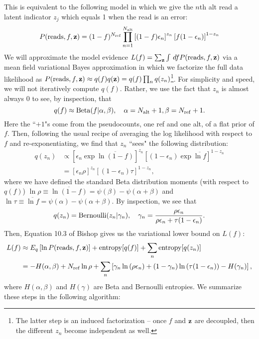\documentclass[nofootinbib,amssymb,amsmath]{revtex4}
\newcommand{\vz}{{\bf z}}
\begin{document}
This is equivalent to the following model in which we give the $n$th alt read a latent indicator $z_j$ which equals 1 when the read is an error:
\begin{align}
P({\rm reads}, f, \vz) = (1-f)^{N_{\rm ref}} \prod_{n=1}^{N_{\rm alt}} \left[ (1-f)\epsilon_n \right]^{z_n} \left[ f (1 - \epsilon_n) \right]^{1 - z_n}
\end{align}
We will approximate the model evidence $L(f) = \sum_\vz \int \, df P({\rm reads}, f, \vz)$ via a mean field variational Bayes approximation in which we factorize the full data likelihood as $P({\rm reads}, f, \vz) \approx q(f) q(\vz) = q(f) \prod_n q(z_n)$\footnote{The latter step is an induced factorization -- once $f$ and $\vz$ are decoupled, then the different $z_n$ become independent as well.}.  For simplicity and speed, we will not iteratively compute $q(f)$.  Rather, we use the fact that $z_n$ is almost always 0 to see, by inspection, that
\begin{equation}
q(f) \approx {\rm Beta}(f | \alpha, \beta), \quad \alpha = N_{\rm alt} + 1, \beta = N_{\rm ref} + 1.
\end{equation}
Here the ``$+1$"s come from the pseudocounts, one ref and one alt, of a flat prior of $f$.  Then, following the usual recipe of averaging the log likelihood with respect to $f$ and re-exponentiating, we find that $z_n$ ``sees" the following distribution:
\begin{align}
q(z_n) &\propto \left[ \epsilon_n \exp \overline{\ln (1 - f)} \right]^{z_n} \left[ (1 - \epsilon_n) \exp \overline{\ln f} \right]^{1 - z_n} \\
&= \left[ \epsilon_n \rho \right]^{z_n} \left[ (1 - \epsilon_n) \tau \right]^{1 - z_n},
\end{align}
where we have defined the standard Beta distribution moments (with respect to $q(f)$) $\ln \rho \equiv \overline{\ln (1 - f)} = \psi(\beta) - \psi(\alpha + \beta)$ and $\ln \tau \equiv \overline{\ln f} = \psi(\alpha) - \psi(\alpha + \beta)$. By inspection, we see that
\begin{equation}
q(z_n) = {\rm Bernoulli}(z_n | \gamma_n), \quad \gamma_n = \frac{ \rho \epsilon_n}{\rho \epsilon_n + \tau (1 - \epsilon_n)}.
\end{equation}
Then, Equation 10.3 of Bishop gives us the variational lower bound on $L(f)$:
\begin{align}
L(f) &\approx E_q \left[ \ln P({\rm reads}, f, \vz) \right] + {\rm entropy}[q(f)] + \sum_n {\rm entropy}[q(z_n)] \\
&= -H(\alpha, \beta) +  N_{\rm ref} \ln \rho + \sum_n \left[ \gamma_n \ln \left( \rho \epsilon_n \right) + (1 - \gamma_n) \ln \left( \tau (1 - \epsilon_n) \right) - H(\gamma_n) \right],
\end{align}
where $H(\alpha, \beta)$ and $H(\gamma)$ are Beta and Bernoulli entropies.  We summarize these steps in the following algorithm:
\end{document}
